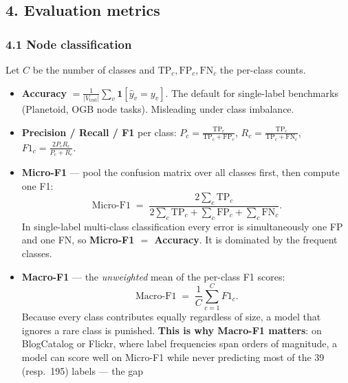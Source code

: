 \subsection*{4. Evaluation metrics}

\subsubsection*{4.1 Node classification}

Let $C$ be the number of classes and $\mathrm{TP}_c,\mathrm{FP}_c,\mathrm{FN}_c$ the
per-class counts.

\begin{itemize}[label=$\bullet$,leftmargin=1.3em]
  \item \textbf{Accuracy} $=\frac{1}{|V_{\text{test}}|}\sum_v \mathbf{1}[\hat{y}_v = y_v]$.
        The default for single-label benchmarks (Planetoid, OGB node tasks). Misleading
        under class imbalance.
  \item \textbf{Precision / Recall / F1} per class:
        $P_c = \frac{\mathrm{TP}_c}{\mathrm{TP}_c+\mathrm{FP}_c}$,
        $R_c = \frac{\mathrm{TP}_c}{\mathrm{TP}_c+\mathrm{FN}_c}$,
        $F1_c = \frac{2P_cR_c}{P_c+R_c}$.
  \item \textbf{Micro-F1} --- pool the confusion matrix over all classes first, then compute
        one F1:
        \begin{equation}
          \text{Micro-F1} \;=\; \frac{2\sum_c \mathrm{TP}_c}
            {2\sum_c \mathrm{TP}_c + \sum_c \mathrm{FP}_c + \sum_c \mathrm{FN}_c}.
          \label{p1:eq:microf1}
        \end{equation}
        In single-label multi-class classification every error is simultaneously one FP and
        one FN, so \textbf{Micro-F1 $=$ Accuracy}. It is dominated by the frequent classes.
  \item \textbf{Macro-F1} --- the \emph{unweighted} mean of the per-class F1 scores:
        \begin{equation}
          \text{Macro-F1} \;=\; \frac{1}{C}\sum_{c=1}^{C} F1_c .
          \label{p1:eq:macrof1}
        \end{equation}
        Because every class contributes equally regardless of size, a model that ignores a
        rare class is punished. \textbf{This is why Macro-F1 matters}: on BlogCatalog or
        Flickr, where label frequencies span orders of magnitude, a model can score well on
        Micro-F1 while never predicting most of the 39 (resp.\ 195) labels --- the gap

\end{itemize}
